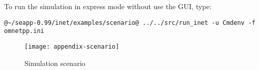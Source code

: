 To run the simulation in express mode without use the GUI, type:
\begin{lstlisting}[language={terminal}]
@~/seapp-0.99/inet/examples/scenario@ ../../src/run_inet -u Cmdenv -f omnetpp.ini
\end{lstlisting}
%
\begin{landscape}
\begin{figure}[b]
\centering
\texttt{[image: appendix-scenario]}
\caption{Simulation scenario}
\label{img:appendix-scenario}
\end{figure}
\end{landscape}









